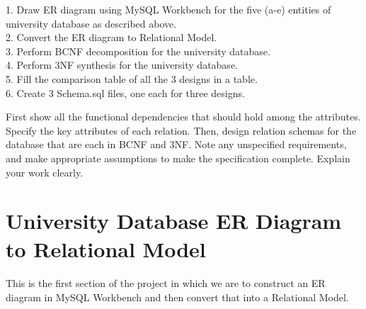 \documentclass[12pt]{article}
\begin{document}
			\vspace{5mm}

			{\setlength{\parindent}{0cm}
			1. Draw ER diagram using MySQL Workbench for the five (a-e) entities of university database as described above.\\
			2. Convert the ER diagram to Relational Model.\\
			3. Perform BCNF decomposition for the university database.\\
			4. Perform 3NF synthesis for the university database.\\
			5. Fill the comparison table of all the 3 designs in a table.\\
			6. Create 3 Schema.sql files, one each for three designs.
			}

			\vspace{5mm}

			{\setlength{\parindent}{0cm}
			First show all the functional dependencies that should hold among the attributes. Specify the key attributes of each relation. Then, design relation schemas for the database that are each in BCNF and 3NF. Note any unspecified requirements, and make appropriate assumptions to make the specification complete. Explain your work clearly.
			}

	\newpage

	\section{University Database ER Diagram to Relational Model}
		\paragraph{}
			This is the first section of the project in which we are to construct an ER diagram in MySQL Workbench and then convert that into a Relational Model.
\end{document}
